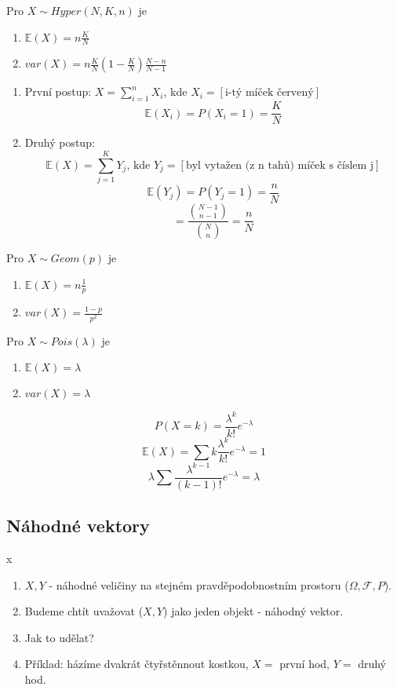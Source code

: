 \documentclass[../main.tex]{subfiles}
\begin{document}
\begin{theorem}
    Pro $X\sim Hyper(N,K,n)$ je
    \begin{enumerate}
        \item $\mathbb{E}(X) = n\frac{K}{N}$
        \item $var(X) = n\frac{K}{N}(1-\frac{K}{N})\frac{N-n}{N-1}$
    \end{enumerate}
    \begin{enumerate}
        \item První postup: $X = \sum^n_{i=1}X_i$, kde $X_i = [\text{i-tý míček červený}]$
        \[\mathbb{E}(X_i) = P(X_i = 1) = \frac{K}{N}\]
        \item Druhý postup:
        \[\mathbb{E}(X) = \sum^K_{j=1} Y_j\text{, kde } Y_j = [\text{byl vytažen (z n tahů) míček s číslem j}]\]
        \[\mathbb{E}(Y_j) = P(Y_j = 1) = \frac{n}{N} \]
        \[= \frac{\binom{N-1}{n-1}}{\binom{N}{n}} = \frac{n}{N}\]
    \end{enumerate}
\end{theorem}

\begin{theorem}
    Pro $X\sim Geom(p)$ je
    \begin{enumerate}
        \item $\mathbb{E}(X) = n\frac{1}{p}$
        \item $var(X) = \frac{1-p}{p^2}$
    \end{enumerate}
\end{theorem}

\begin{theorem}
    Pro $X\sim Pois(\lambda)$ je
    \begin{enumerate}
        \item $\mathbb{E}(X) = \lambda$
        \item $var(X) = \lambda$
    \end{enumerate}
    \[P(X=k) = \frac{\lambda^k}{k!}e^{-\lambda}\]
    \[\mathbb{E}(X) = \sum k \frac{\lambda^k}{k!}e^{-\lambda} = 1\]
    \[\lambda \sum \frac{\lambda^{k-1}}{(k-1)!}e^{-\lambda} = \lambda\]    
\end{theorem}

\subsection{Náhodné vektory}

\begin{definition}
    {\color{white} x}
    \begin{enumerate}
        \item $X,Y$ - náhodné veličiny na stejném pravděpodobnostním prostoru ($\Omega, \mathcal{F},P$).
        \item Budeme chtít uvažovat ($X,Y$) jako jeden objekt - náhodný vektor.
        \item Jak to udělat?
        \item Příklad: házíme dvakrát čtyřstěnnout kostkou, $X = $ první hod, $Y = $ druhý hod.
    \end{enumerate}
\end{definition}
\end{document}

